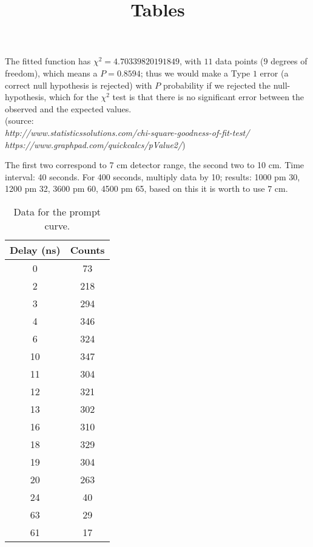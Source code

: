 \documentclass{article}
\title{Tables}
\begin{document}
\par The fitted function has $\chi^2 = 4.70339820191849$, with $11$ data points ($9$ degrees of freedom), which means a $P=0.8594$; thus we would make a Type $1$ error (a correct null hypothesis is rejected) with $P$ probability if we rejected the null-hypothesis, which for the $\chi^2$ test is that there is no significant error between the observed and the expected values. \\
(source: \\
\textit{http://www.statisticssolutions.com/chi-square-goodness-of-fit-test/ \\
https://www.graphpad.com/quickcalcs/pValue2/})
\par The first two correspond to 7 cm detector range, the second two to 10 cm. Time interval: 40 seconds. For 400 seconds, multiply data by 10; results: 1000 pm 30, 1200 pm 32, 3600 pm 60, 4500 pm 65, based on this it is worth to use 7 cm. 
\begin{table}
\centering
\begin{tabular}{| c | c |}
\hline
Delay (ns)	&	Counts\\[0.5ex] \hline\hline
0			& 	73\\ 	\hline
2			& 	218\\	\hline
3			& 	294\\	\hline
4			& 	346\\	\hline
6			& 	324\\	\hline
10			& 	347\\	\hline
11			& 	304\\ 	\hline
12			& 	321\\	\hline
13			& 	302\\	\hline
16			& 	310\\	\hline
18			& 	329\\	\hline
19			& 	304\\	\hline
20			& 	263\\	\hline
24			& 	40\\	\hline
63			& 	29\\	\hline
61			& 	17\\	\hline
\end{tabular}
\caption{Data for the prompt curve.}
\end{table}
\end{document}
